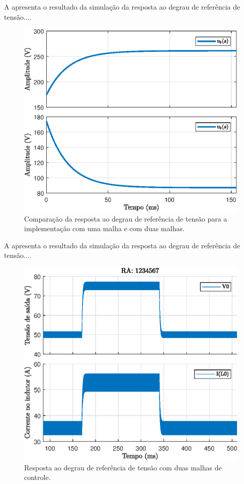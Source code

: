 



A  apresenta o resultado da simulação da resposta ao degrau de referência de tensão....

\begin{figure}[!ht]
	\centering
	\includegraphics[width=0.9\linewidth]{Figs/BoostStepResponse2malhas}
	\caption{Comparação da resposta ao degrau de referência de tensão para a implementação com uma malha e com duas malhas.}
	\label{fig:BoostStepResponse2malhas}
\end{figure}


A  apresenta o resultado da simulação da resposta ao degrau de referência de tensão....

\begin{figure}[!ht]
	\centering
	\includegraphics[width=0.9\linewidth]{Figs/Buck2malhas}
	\caption{Resposta ao degrau de referência de tensão com duas malhas de controle.}
	\label{fig:Buck2malhas}
\end{figure}

